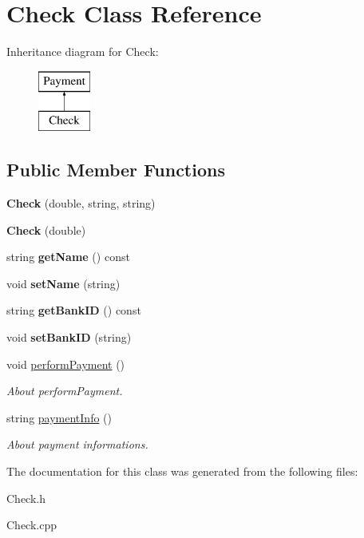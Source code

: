 \hypertarget{classCheck}{}\section{Check Class Reference}
\label{classCheck}
Inheritance diagram for Check\+:\begin{figure}[H]
\begin{center}
\leavevmode
\includegraphics[height=2.000000cm]{classCheck}
\end{center}
\end{figure}
\subsection*{Public Member Functions}
\begin{DoxyCompactItemize}
\item 
\mbox{\label{classCheck_af5cce3688521fb9a053211d99c7bef87}} 
{\bfseries Check} (double, string, string)
\item 
\mbox{\label{classCheck_a494e84c7b7821a3f01d5c80a681490d5}} 
{\bfseries Check} (double)
\item 
\mbox{\label{classCheck_ad69d6ef75ccbb9408f13492fec897c2c}} 
string {\bfseries get\+Name} () const
\item 
\mbox{\label{classCheck_a84bb7861c25da17be6c5945d48af9415}} 
void {\bfseries set\+Name} (string)
\item 
\mbox{\label{classCheck_a5e432d25844fafb063cacf4919d23c12}} 
string {\bfseries get\+Bank\+ID} () const
\item 
\mbox{\label{classCheck_a3b0603c910f0b2395cb472bf903bdee4}} 
void {\bfseries set\+Bank\+ID} (string)
\item 
\mbox{\label{classCheck_adace560cdb9f0faa151b82fe0deb5070}} 
void \hyperlink{classCheck_adace560cdb9f0faa151b82fe0deb5070}{perform\+Payment} ()
\begin{DoxyCompactList}\small\item\em About perform\+Payment. \end{DoxyCompactList}\item 
\mbox{\label{classCheck_ab310ce98f6929d4a214c3d120824d2e4}} 
string \hyperlink{classCheck_ab310ce98f6929d4a214c3d120824d2e4}{payment\+Info} ()
\begin{DoxyCompactList}\small\item\em About payment informations. \end{DoxyCompactList}\end{DoxyCompactItemize}


The documentation for this class was generated from the following files\+:\begin{DoxyCompactItemize}
\item 
Check.\+h\item 
Check.\+cpp\end{DoxyCompactItemize}

